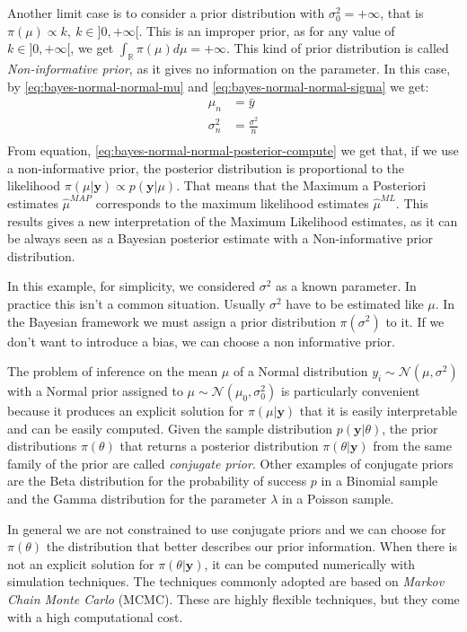 \documentclass[a4paper, nobind]{templates/ociamthesis}
\theoremstyle{definition}
\theoremstyle{definition}
\theoremstyle{definition}
\theoremstyle{remark}
\begin{document}
Another limit case is to consider a prior distribution with \(\sigma_0^2 = +\infty\), that is \(\pi(\mu)\propto k, \ k\in]0,+\infty[\). This is an improper prior, as for any value of \(k\in]0,+\infty[\), we get \(\int_{\mathbb{R}}{\pi(\mu)d\mu}=+\infty\). This kind of prior distribution is called \emph{Non-informative prior}, as it gives no information on the parameter. In this case, by \eqref{eq:bayes-normal-normal-mu} and \eqref{eq:bayes-normal-normal-sigma} we get:
\begin{align*}
\mu_n & = \bar{y} \\
\sigma_n^2 & = \frac{\sigma^2}{n} \\
\end{align*}
From equation, \eqref{eq:bayes-normal-normal-posterior-compute} we get that, if we use a non-informative prior, the posterior distribution is proportional to the likelihood \(\pi(\mu|\boldsymbol{y}) \propto p(\boldsymbol{y}|\mu)\). That means that the Maximum a Posteriori estimates \(\hat{\mu}^{MAP}\) corresponds to the maximum likelihood estimates \(\hat{\mu}^{ML}\). This results gives a new interpretation of the Maximum Likelihood estimates, as it can be always seen as a Bayesian posterior estimate with a Non-informative prior distribution.

In this example, for simplicity, we considered \(\sigma^2\) as a known parameter. In practice this isn't a common situation. Usually \(\sigma^2\) have to be estimated like \(\mu\). In the Bayesian framework we must assign a prior distribution \(\pi(\sigma^2)\) to it. If we don't want to introduce a bias, we can choose a non informative prior.

The problem of inference on the mean \(\mu\) of a Normal distribution \(y_i\sim\mathcal{N}(\mu, \sigma^2)\) with a Normal prior assigned to \(\mu\sim\mathcal{N}(\mu_0, \sigma_0^2)\) is particularly convenient because it produces an explicit solution for \(\pi(\mu|\boldsymbol{y})\) that it is easily interpretable and can be easily computed. Given the sample distribution \(p(\boldsymbol{y}|\theta)\), the prior distributions \(\pi(\theta)\) that returns a posterior distribution \(\pi(\theta|\boldsymbol{y})\) from the same family of the prior are called \emph{conjugate prior}. Other examples of conjugate priors are the Beta distribution for the probability of success \(p\) in a Binomial sample and the Gamma distribution for the parameter \(\lambda\) in a Poisson sample.

In general we are not constrained to use conjugate priors and we can choose for \(\pi(\theta)\) the distribution that better describes our prior information. When there is not an explicit solution for \(\pi(\theta|\boldsymbol{y})\), it can be computed numerically with simulation techniques. The techniques commonly adopted are based on \emph{Markov Chain Monte Carlo} (MCMC). These are highly flexible techniques, but they come with a high computational cost.
\end{document}
